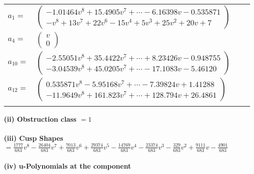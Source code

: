 \documentclass[1p]{elsarticle_modified}
\theoremstyle{definition}
\begin{document}
\begin{tabular}{m{7pt} m{180pt} m{7pt} m{180pt} }
\flushright $a_{1}=$&$\begin{pmatrix}-1.01464 v^{8}+15.4905 v^{7}+\cdots-6.16398 v-0.535871\\- v^8+13 v^7+22 v^6-15 v^4+5 v^3+25 v^2+20 v+7\end{pmatrix}$ \\
\flushright $a_{4}=$&$\begin{pmatrix}v\\0\end{pmatrix}$ \\
\flushright $a_{10}=$&$\begin{pmatrix}-2.55051 v^{8}+35.4422 v^{7}+\cdots+8.23426 v-0.948755\\-3.04539 v^{8}+45.0205 v^{7}+\cdots-17.1083 v-5.46120\end{pmatrix}$ \\
\flushright $a_{12}=$&$\begin{pmatrix}0.535871 v^{8}-5.95168 v^{7}+\cdots-7.39824 v+1.41288\\-11.9649 v^{8}+161.823 v^{7}+\cdots+128.794 v+26.4861\end{pmatrix}$\\&\end{tabular}
\flushleft \textbf{(ii) Obstruction class $= 1$}\\~\\
\flushleft \textbf{(iii) Cusp Shapes $= \frac{1777}{683} v^8-\frac{26404}{683} v^7+\frac{7013}{683} v^6+\frac{29374}{683} v^5-\frac{14769}{683} v^4-\frac{23374}{683} v^3-\frac{329}{683} v^2+\frac{9111}{683} v-\frac{4901}{683}$}\\~\\
\newpage\renewcommand{\arraystretch}{1}
\flushleft \textbf{(iv) u-Polynomials at the component}\newline \\
\end{document}
